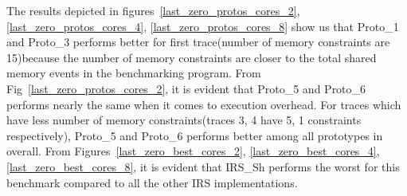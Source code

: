 The results depicted in figures~\ref{last_zero_protos_cores_2}, \ref{last_zero_protos_cores_4}, \ref{last_zero_protos_cores_8} show us that Proto\_1 and Proto\_3 performs better for first trace(number of memory constraints are 15)because the number of memory constraints are closer to the total shared memory events in the benchmarking program. 
From Fig~\ref{last_zero_protos_cores_2}, it is evident that Proto\_5 and Proto\_6 performs nearly the same when it comes to execution overhead. 
For traces which have less number of memory constraints(traces 3, 4 have 5, 1 constraints respectively), Proto\_5 and Proto\_6 performs better among all prototypes in overall. 
From Figures~\ref{last_zero_best_cores_2}, \ref{last_zero_best_cores_4}, \ref{last_zero_best_cores_8}, it is evident that IRS\_Sh performs the worst for this benchmark compared to all the other IRS implementations. 
